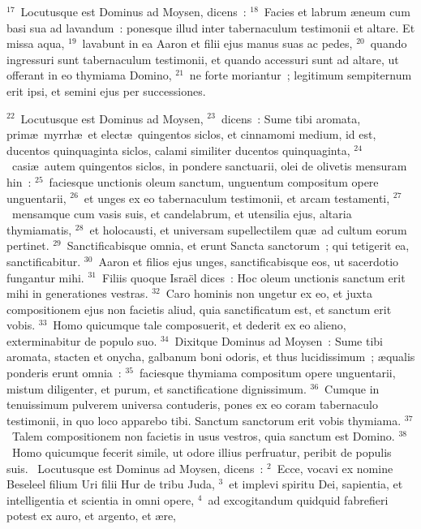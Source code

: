${}^{17}$~Locutusque est Dominus ad Moysen, dicens~:
${}^{18}$~Facies et labrum \ae neum cum basi sua ad lavandum~: ponesque illud inter tabernaculum testimonii et altare. Et missa aqua,
${}^{19}$~lavabunt in ea Aaron et filii ejus manus suas ac pedes,
${}^{20}$~quando ingressuri sunt tabernaculum testimonii, et quando accessuri sunt ad altare, ut offerant in eo thymiama Domino,
${}^{21}$~ne forte moriantur~; legitimum sempiternum erit ipsi, et semini ejus per successiones.


${}^{22}$~Locutusque est Dominus ad Moysen,
${}^{23}$~dicens~: Sume tibi aromata, prim\ae\ myrrh\ae\ et elect\ae\ quingentos siclos, et cinnamomi medium, id est, ducentos quinquaginta siclos, calami similiter ducentos quinquaginta,
${}^{24}$~casi\ae\ autem quingentos siclos, in pondere sanctuarii, olei de olivetis mensuram hin~:
${}^{25}$~faciesque unctionis oleum sanctum, unguentum compositum opere unguentarii,
${}^{26}$~et unges ex eo tabernaculum testimonii, et arcam testamenti,
${}^{27}$~mensamque cum vasis suis, et candelabrum, et utensilia ejus, altaria thymiamatis,
${}^{28}$~et holocausti, et universam supellectilem qu\ae\ ad cultum eorum pertinet.
${}^{29}$~Sanctificabisque omnia, et erunt Sancta sanctorum~; qui tetigerit ea, sanctificabitur.
${}^{30}$~Aaron et filios ejus unges, sanctificabisque eos, ut sacerdotio fungantur mihi.
${}^{31}$~Filiis quoque Isra\"el dices~: Hoc oleum unctionis sanctum erit mihi in generationes vestras.
${}^{32}$~Caro hominis non ungetur ex eo, et juxta compositionem ejus non facietis aliud, quia sanctificatum est, et sanctum erit vobis.
${}^{33}$~Homo quicumque tale composuerit, et dederit ex eo alieno, exterminabitur de populo suo.
${}^{34}$~Dixitque Dominus ad Moysen~: Sume tibi aromata, stacten et onycha, galbanum boni odoris, et thus lucidissimum~; \ae qualis ponderis erunt omnia~:
${}^{35}$~faciesque thymiama compositum opere unguentarii, mistum diligenter, et purum, et sanctificatione dignissimum.
${}^{36}$~Cumque in tenuissimum pulverem universa contuderis, pones ex eo coram tabernaculo testimonii, in quo loco apparebo tibi. Sanctum sanctorum erit vobis thymiama.
${}^{37}$~Talem compositionem non facietis in usus vestros, quia sanctum est Domino.
${}^{38}$~Homo quicumque fecerit simile, ut odore illius perfruatur, peribit de populis suis.
~Locutusque est Dominus ad Moysen, dicens~:
${}^{2}$~Ecce, vocavi ex nomine Beseleel filium Uri filii Hur de tribu Juda,
${}^{3}$~et implevi spiritu Dei, sapientia, et intelligentia et scientia in omni opere,
${}^{4}$~ad excogitandum quidquid fabrefieri potest ex auro, et argento, et \ae re,
